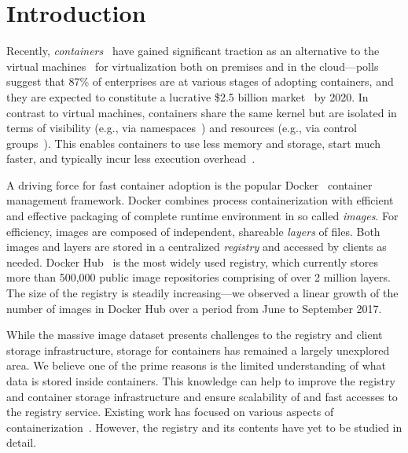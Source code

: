 \section{Introduction}


Recently, \emph{containers}~\cite{process-containers-linux} have
gained significant traction as an alternative to the virtual
machines~\cite{rosenblum2005virtual} for virtualization both on
premises and in the cloud---polls suggest that 87\% of enterprises are
at various stages of adopting containers, and they are expected to
constitute a lucrative \$2.5 billion
market~\cite{container-grow-by2020} by 2020.
%
In contrast to virtual machines, containers share the same kernel but
are isolated in terms of visibility (e.g., via
namespaces~\cite{man-namespaces}) and resources (e.g., via control
groups~\cite{kernel-doc-cgroups}). This enables containers to use
less memory and storage, start much faster, and typically incur less
execution overhead~\cite{Disco, felter2015updated,
	HypervisorsvsLightweight}.
	
A driving force for fast container
adoption is the popular Docker~\cite{docker} container management
framework. Docker combines process containerization with efficient and
effective packaging  of complete runtime environment
in so called {\em images}.
For efficiency, images are composed of independent,
shareable {\em layers} of files.
%
Both images
and layers are stored in a centralized \emph{registry} and accessed by clients as needed.
%
Docker Hub~\cite{docker-hub} is the most widely used registry, which currently
stores more than 500,000 public image repositories comprising of over 2 million layers.
The size of the registry 
is steadily increasing---we observed a linear growth of the
number of images in Docker Hub over a period from June to September 2017.


While the massive image dataset presents challenges to the registry
and client storage
infrastructure, storage for containers has remained a largely unexplored
area.
%
We believe one of the prime reasons is the limited understanding of what data
is stored inside containers.
%
This knowledge can help to improve the registry and container
storage infrastructure and ensure scalability of and fast accesses to the
registry service.
%
Existing work has focused on various aspects of
containerization~\cite{dockerssd, dockerfinder, analysisdockergithub,
slacker, dockervulnerabile}.
However, the registry and its contents have yet to be studied in detail.

